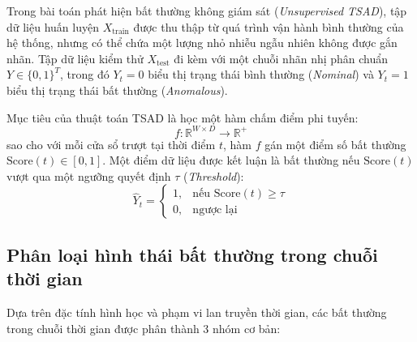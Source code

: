 \documentclass[11pt,journal,onecolumn]{IEEEtran}
\begin{document}
Trong bài toán phát hiện bất thường không giám sát (\textit{Unsupervised TSAD}), tập dữ liệu huấn luyện $X_{\text{train}}$ được thu thập từ quá trình vận hành bình thường của hệ thống, nhưng có thể chứa một lượng nhỏ nhiễu ngẫu nhiên không được gắn nhãn. Tập dữ liệu kiểm thử $X_{\text{test}}$ đi kèm với một chuỗi nhãn nhị phân chuẩn $Y \in \{0, 1\}^T$, trong đó $Y_t = 0$ biểu thị trạng thái bình thường (\textit{Nominal}) và $Y_t = 1$ biểu thị trạng thái bất thường (\textit{Anomalous}). 

Mục tiêu của thuật toán TSAD là học một hàm chấm điểm phi tuyến:
\begin{equation}
f: \mathbb{R}^{W \times D} \rightarrow \mathbb{R}^+
\end{equation}
sao cho với mỗi cửa sổ trượt tại thời điểm $t$, hàm $f$ gán một điểm số bất thường $\text{Score}(t) \in [0, 1]$. Một điểm dữ liệu được kết luận là bất thường nếu $\text{Score}(t)$ vượt qua một ngưỡng quyết định $\tau$ (\textit{Threshold}):
\begin{equation}
\hat{Y}_t = 
\begin{cases}
1, & \text{nếu } \text{Score}(t) \ge \tau \\
0, & \text{ngược lại}
\end{cases}
\end{equation}

\subsection{Phân loại hình thái bất thường trong chuỗi thời gian}
Dựa trên đặc tính hình học và phạm vi lan truyền thời gian, các bất thường trong chuỗi thời gian được phân thành 3 nhóm cơ bản:
\end{document}
